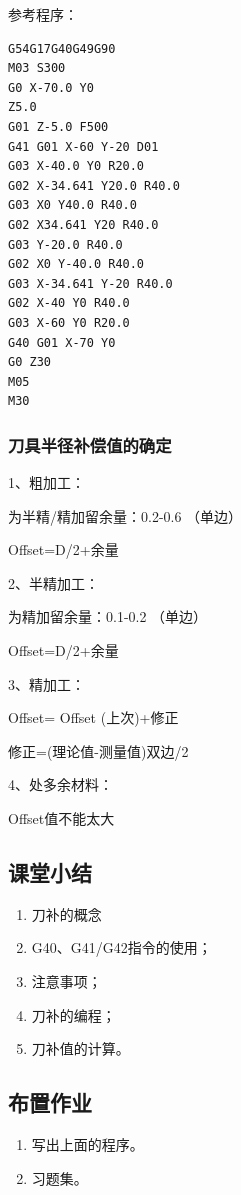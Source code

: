 参考程序：
\begin{lstlisting}
G54G17G40G49G90
M03 S300
G0 X-70.0 Y0
Z5.0
G01 Z-5.0 F500
G41 G01 X-60 Y-20 D01
G03 X-40.0 Y0 R20.0
G02 X-34.641 Y20.0 R40.0
G03 X0 Y40.0 R40.0
G02 X34.641 Y20 R40.0
G03 Y-20.0 R40.0
G02 X0 Y-40.0 R40.0
G03 X-34.641 Y-20 R40.0
G02 X-40 Y0 R40.0
G03 X-60 Y0 R20.0
G40 G01 X-70 Y0
G0 Z30
M05
M30
\end{lstlisting}

\subsubsection{刀具半径补偿值的确定}

1、粗加工：

为半精/精加留余量：0.2-0.6 （单边）

Offset=D/2+余量

2、半精加工：

为精加留余量：0.1-0.2 （单边）

Offset=D/2+余量

3、精加工：

Offset= Offset (上次)+修正

修正=(理论值-测量值)双边/2 

4、处多余材料：

Offset值不能太大



\subsection{课堂小结}
\begin{enumerate}[1、]
\item 刀补的概念
\item G40、G41/G42指令的使用；
\item 注意事项；
\item 刀补的编程；
\item 刀补值的计算。
\end{enumerate}

\vfill
\subsection{布置作业}
\begin{enumerate}[1、]
	\item 写出上面的程序。
\item 习题集。
\end{enumerate}
\vfill